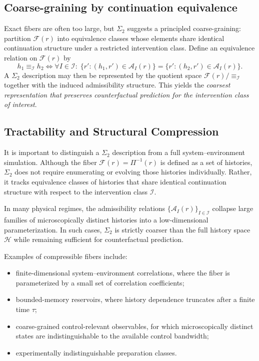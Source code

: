 \subsection{Coarse-graining by continuation equivalence}

Exact fibers are often too large, but $\Sigma_2$ suggests a principled coarse-graining: partition
$\mathcal{F}(r)$ into equivalence classes whose elements share identical continuation structure
under a restricted intervention class. Define an equivalence relation on $\mathcal{F}(r)$ by
\begin{equation}
h_1 \equiv_{\mathcal{I}} h_2
\iff
\forall I\in\mathcal{I}:\;
\{r':(h_1,r')\in\mathcal{A}_I(r)\}
=
\{r':(h_2,r')\in\mathcal{A}_I(r)\}.
\end{equation}
A $\Sigma_2$ description may then be represented by the quotient space $\mathcal{F}(r)/{\equiv_{\mathcal{I}}}$
together with the induced admissibility structure. This yields the \emph{coarsest representation
that preserves counterfactual prediction for the intervention class of interest}.

\subsection{Tractability and Structural Compression}
\label{sec:tractability-compression}

It is important to distinguish a $\Sigma_2$ description from a full
system--environment simulation. Although the fiber
$\mathcal{F}(r)=\Pi^{-1}(r)$ is defined as a set of histories, $\Sigma_2$
does not require enumerating or evolving those histories individually.
Rather, it tracks equivalence classes of histories that share identical
continuation structure with respect to the intervention class
$\mathcal{I}$.

In many physical regimes, the admissibility relations
$\{\mathcal{A}_I(r)\}_{I\in\mathcal{I}}$ collapse large families of
microscopically distinct histories into a low-dimensional
parameterization. In such cases, $\Sigma_2$ is strictly coarser than the
full history space $\mathcal{H}$ while remaining sufficient for
counterfactual prediction.

Examples of compressible fibers include:
\begin{itemize}
  \item finite-dimensional system--environment correlations, where the
  fiber is parameterized by a small set of correlation coefficients;
  \item bounded-memory reservoirs, where history dependence truncates
  after a finite time $\tau$;
  \item coarse-grained control-relevant observables, for which
  microscopically distinct states are indistinguishable to the available
  control bandwidth;
  \item experimentally indistinguishable preparation classes.
\end{itemize}

